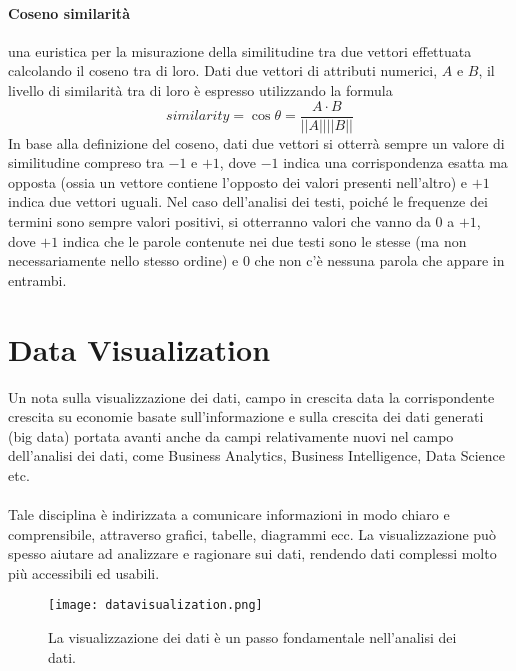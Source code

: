 \paragraph{Coseno similarità} una euristica per la misurazione della similitudine tra due vettori effettuata calcolando il coseno tra di loro. Dati due vettori di attributi numerici, $A$ e $B$, il livello di similarità tra di loro è espresso utilizzando la formula
\begin{equation}
	similarity = \cos \theta = \frac{A\cdot B}{||A||||B||}
\end{equation}
In base alla definizione del coseno, dati due vettori si otterrà sempre un valore di similitudine compreso tra $-1$ e $+1$, dove $-1$ indica una corrispondenza esatta ma opposta (ossia un vettore contiene l'opposto dei valori presenti nell'altro) e $+1$ indica due vettori uguali.
Nel caso dell'analisi dei testi, poiché le frequenze dei termini sono sempre valori positivi, si otterranno valori che vanno da 0 a $+1$, dove $+1$ indica che le parole contenute nei due testi sono le stesse (ma non necessariamente nello stesso ordine) e $0$ che non c'è nessuna parola che appare in entrambi.


\section{Data Visualization}
Un nota sulla visualizzazione dei dati, campo in crescita data la corrispondente crescita su economie basate sull’informazione e sulla crescita dei dati generati (big data) portata avanti anche da campi relativamente nuovi nel campo dell’analisi dei dati, come Business Analytics, Business Intelligence, Data Science etc.
\\\\
Tale disciplina è indirizzata a comunicare informazioni in modo chiaro e comprensibile, attraverso grafici, tabelle, diagrammi ecc. La visualizzazione può spesso aiutare ad analizzare e ragionare sui dati, rendendo dati complessi molto più accessibili ed usabili.
\begin{figure}[htb]
	\centering
	\texttt{[image: datavisualization.png]}
	\caption{La visualizzazione dei dati è un passo fondamentale nell'analisi dei dati.}
	\label{datavisualization}
\end{figure}

